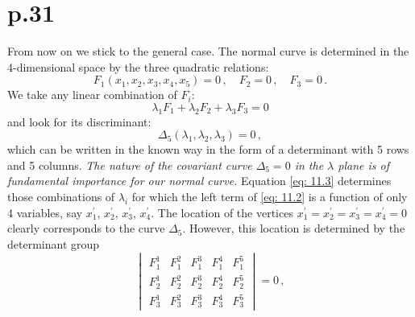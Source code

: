 \documentclass[leqno]{article}
\begin{document}
\section{p.31}
From now on we stick to the general case. The normal curve is determined in the 4-dimensional space by the three quadratic relations: 
\begin{equation}\label{eq: 11.1}
F_1(x_1, x_2, x_3, x_4, x_5) = 0 \, , \quad F_2=0 \, , \quad F_3=0 \, . \tag{1}
\end{equation}
We take any linear combination of $F_i$: 
\begin{equation}\label{eq: 11.2}
\lambda_1 F_1 + \lambda_2 F_2 + \lambda_3 F_3 = 0 \tag{2}
\end{equation} 
and look for its discriminant: 
\begin{equation}\label{eq: 11.3}
\Delta_5(\lambda_1, \lambda_2, \lambda_3) = 0 \, , \tag{3}
\end{equation} 
which can be written in the known way in the form of a determinant with 5 rows and 5 columns. \textit{The nature of the covariant curve $\Delta_5=0$ in the $\lambda$ plane is of fundamental importance for our normal curve.} Equation \eqref{eq: 11.3} determines those combinations of $\lambda_i$ for which the left term of \eqref{eq: 11.2} is a function of only 4 variables, say $x_1^\prime$, $x_2^\prime$, $x_3^\prime$, $x_4^\prime$. The location of the vertices $x_1^\prime = x_2^\prime = x_3^\prime = x_4^\prime=0$ clearly corresponds to the curve $\Delta_5$.
However, this location is determined by the determinant group 
\begin{equation}\label{eq: 11.4}
\begin{vmatrix}
F_1^1 & F_1^2 & F_1^3 & F_1^4 & F_1^5 \\ F_2^1 & F_2^2 & F_2^3 & F_2^4 & F_2^5 \\ F_3^1 & F_3^2 & F_3^3 & F_3^4 & F_3^5 
\end{vmatrix} = 0 \, , \tag{4}
\end{equation}
\end{document}
